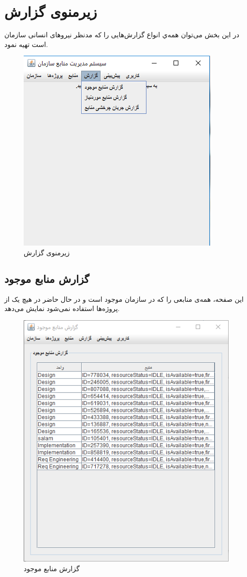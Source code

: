 \newpage
\section{زیرمنوی گزارش}
در این بخش می‌توان همه‌ي انواع گزارش‌هایی را که مدنظر نیروهای انسانی سازمان است تهیه نمود.
	\begin{figure}[H]
		\centering
		\includegraphics[scale=0.7]{img/manual/repSubmenu}
		\caption{زیرمنوی گزارش}
	\end{figure}
	
\subsection{گزارش منابع موجود}
 این صفحه، همه‌ی منابعی را که در سازمان موجود است و در حال حاضر در هیچ یک از پروژه‌ها استفاده نمی‌شود نمایش می‌دهد.
	\begin{figure}[H]
		\centering
		\includegraphics[scale=0.7]{img/manual/availRep}
		\caption{گزارش منابع موجود}
	\end{figure}


